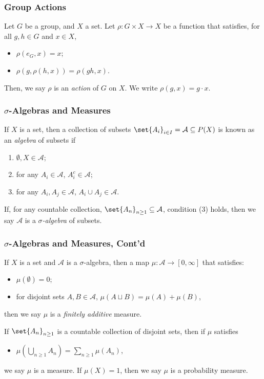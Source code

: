 \documentclass{beamer-custom}
\begin{document}
\begin{frame}
  \frametitle{Group Actions}
  Let $G$ be a group, and $X$ a set. Let $\rho\colon G\times X \rightarrow X$ be a function that satisfies, for all $g,h\in G$ and $x\in X$,
  \begin{itemize}
    \item $\rho\left( e_G, x\right) = x$;
    \item $\rho\left( g,\rho\left( h,x \right) \right) = \rho\left( gh,x \right)$.
  \end{itemize}
  Then, we say $\rho$ is an \textit{action} of $G$ on $X$. We write $\rho\left( g,x \right) = g\cdot x$.
\end{frame}
\begin{frame}
  \frametitle{$\sigma$-Algebras and Measures}
  If $X$ is a set, then a collection of subsets $\set{A_{i}}_{i\in I} = \mathcal{A}\subseteq P(X)$ is known as an \textit{algebra} of subsets if
  \begin{enumerate}
    \item $\emptyset,X\in \mathcal{A}$;
    \item for any $A_i\in \mathcal{A}$, $A_i^{c}\in \mathcal{A}$;
    \item for any $A_i,A_j\in \mathcal{A}$, $A_i\cup A_j\in \mathcal{A}$.
  \end{enumerate}\pause
  If, for any countable collection, $\set{A_n}_{n\geq 1}\subseteq \mathcal{A}$, condition (3) holds, then we say $\mathcal{A}$ is a \textit{$\sigma$-algebra} of subsets.
\end{frame}
\begin{frame}
  \frametitle{$\sigma$-Algebras and Measures, Cont'd}
  If $X$ is a set and $\mathcal{A}$ is a $\sigma$-algebra, then a map $\mu\colon \mathcal{A}\rightarrow [0,\infty]$ that satisfies:
  \begin{itemize}
    \item $\mu\left( \emptyset \right) = 0$;
    \item for disjoint sets $A,B\in \mathcal{A}$, $\mu\left( A\sqcup B \right) = \mu\left( A \right) + \mu\left( B \right)$,
  \end{itemize}
  then we say $\mu$ is a \textit{finitely additive} measure.\pause \newline

  If $\set{A_n}_{n\geq 1}$ is a countable collection of disjoint sets, then if $\mu$ satisfies
  \begin{itemize}
    \item $\displaystyle \mu\left( \bigcup_{n\geq 1}A_n \right) = \sum_{n\geq 1}\mu\left( A_n \right)$,
  \end{itemize}
  we say $\mu$ is a measure. If $\mu\left( X \right) = 1$, then we say $\mu$ is a probability measure.
\end{frame}
\end{document}
